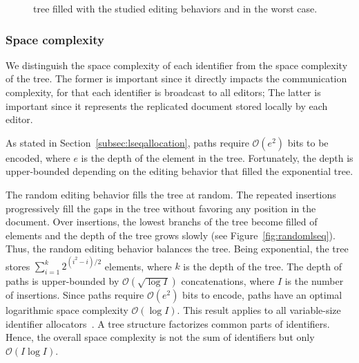 \begin{figure}
  \centering
  \hspace{5pt}
  \hspace{5pt}
  \caption{\label{fig:complexity} \LSEQ tree filled with the studied editing
    behaviors and in the worst case.}
\end{figure}


\subsubsection{Space complexity}

We distinguish the space complexity of each identifier from the space complexity
of the tree. The former is important since it directly impacts the communication
complexity, for that each identifier is broadcast to all editors; The latter is
important since it represents the replicated document stored locally by each
editor.

As stated in Section~\ref{subsec:lseqallocation}, paths
require $\mathcal{O}(e^2)$ bits to be encoded,
where $e$ is the depth of the element in the tree. Fortunately, the depth is
upper-bounded depending on the editing behavior that filled the exponential
tree.

The random editing behavior fills the tree at random. The repeated insertions
progressively fill the gaps in the tree without favoring any position in the
document. Over insertions, the lowest branchs of the tree become filled of
elements and the depth of the tree grows slowly (see
Figure~\ref{fig:randomlseq}). Thus, the random editing behavior balances the
tree. Being exponential, the tree stores
$\textstyle\sum\nolimits_{i=1}^{k}{2^{(i^2-i)/2}}$ elements, where $k$ is the
depth of the tree. The depth of paths is upper-bounded by
$\mathcal{O}(\sqrt{\log I})$ concatenations, where $I$ is the number of
insertions. Since paths require $\mathcal{O}(e^2)$ bits to encode, paths have an
optimal logarithmic space complexity $\mathcal{O}(\log I)$. This result applies
to all variable-size identifier allocators~\cite{preguica2009commutative,
  weiss2009logoot}. A tree structure factorizes common parts of
identifiers. Hence, the overall space complexity is not the sum of identifiers
but only $\mathcal{O}(I\log I)$.

